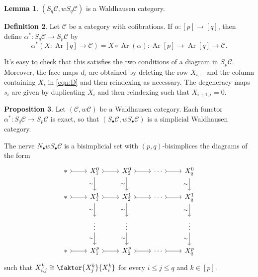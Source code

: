 \documentclass[10pt,letterpaper,cm]{nupset}
\theoremstyle{definition}
\newtheorem{definition}{Definition}
\theoremstyle{theorem}
\newtheorem{lemma}[definition]{Lemma}
\newtheorem{prop}[definition]{Proposition}
\theoremstyle{remark}
\newcommand{\1}{\mathbf{1}}
\renewcommand{\c}{\mathscr{C}}
\newcommand{\0}{\vec 0}
\DeclareMathOperator{\Ar}{Ar}
\begin{document}
\begin{lemma}
$\left(S_q \c, wS_q \c\right)$ is a Waldhausen category. 
\end{lemma}

\begin{definition}
Let $\c$ be a category with cofibrations. If $\alpha : [p] \to \left[q\right]$, then define $\alpha^{\ast} : S_q \c \to S_p \c$ by
$$\alpha^{\ast}(X: \Ar\left[q\right] \to \c) = X \circ \Ar(\alpha) : \Ar[p] \to \Ar\left[q\right] \to \c.$$
\end{definition}

It's easy to check that this satisfies the two conditions of a diagram in $S_p \c$.
Moreover, the face maps $d_i$ are obtained by deleting the row $X_{i, -}$ and the column containing $X_i$ in \eqref{eqn:D} and then reindexing as necessary. The degeneracy maps $s_i$ are given by duplicating $X_i$ and then reindexing such that $X_{i+1, i} =0$.

\begin{prop}
Let $\left(\c, w{\c}\right)$ be a Waldhausen category. Each functor $\alpha^{\ast}: S_q \c \to S_p \c$ is exact, so that $\left(S_{\bullet}\c, wS_{\bullet} \c\right)$ is a simplicial Waldhausen category.
\end{prop}	


The nerve $N_{\bullet}w S_{\bullet}\c$ is a bisimplicial set with $\left(p,q\right)$-bisimplices the diagrams of the form
\[
\begin{tikzcd}
\ast \arrow[r, tail] & X_1^0 \arrow[d, "\sim"'] \arrow[r, tail] & X_2^0 \arrow[r, tail] \arrow[d, "\sim"'] & \cdots \arrow[r, tail] & X_q^0 \arrow[d, "\sim"'] \\
\ast \arrow[r, tail] & X_1^1 \arrow[d, "\sim"'] \arrow[r, tail] & X_2^1 \arrow[r, tail] \arrow[d, "\sim"'] & \cdots \arrow[r, tail] & X_q^1 \arrow[d, "\sim"'] \\
 & \vdots \arrow[d, "\sim"'] & \vdots \arrow[d, "\sim"'] &  & \vdots \arrow[d, "\sim"'] \\
\ast \arrow[r, tail] & X_1^p \arrow[r, tail] & X_2^p \arrow[r, tail] & \cdots \arrow[r, tail] & X_q^p
\end{tikzcd}
\]
such that $X^k_{i,j} \cong \faktor{X_j^k}{X_i^k}$ for every $i\leq j\leq q$ and $k\in \left[p\right]$. 
\end{document}

